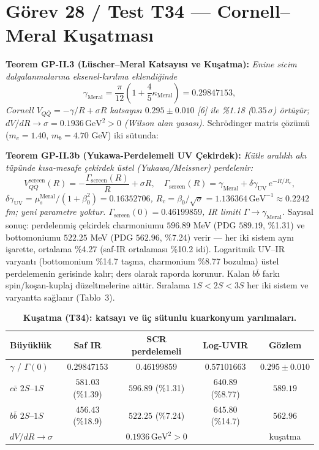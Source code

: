 \documentclass[12pt,a4paper]{article}
\begin{document}
\section{Görev 28 / Test T34 --- Cornell--Meral Kuşatması}

\textbf{Teorem GP-II.3 (Lüscher--Meral Katsayısı ve Kuşatma):} \textit{Enine
sicim dalgalanmalarına eksenel-kırılma eklendiğinde}
\begin{equation}
\boxed{\gamma_{\mathrm{Meral}}=\frac{\pi}{12}
\left(1+\frac{4}{5}\kappa_{\mathrm{Meral}}\right)=0.29847153,}
\end{equation}
\textit{Cornell $V_{Q\bar{Q}}=-\gamma/R+\sigma R$ katsayısı
$0.295\pm 0.010$ [6] ile \%1.18 ($0.35\,\sigma$) örtüşür;
$dV/dR\to\sigma=0.1936\,\mathrm{GeV}^2>0$ (Wilson alan yasası).}
Schrödinger matris çözümü ($m_c=1.40$, $m_b=4.70$ GeV) iki sütunda:

\textbf{Teorem GP-II.3b (Yukawa-Perdelemeli UV Çekirdek):}
\textit{Kütle aralıklı akı tüpünde kısa-mesafe çekirdek üstel (Yukawa/Meissner)
perdelenir:}
\begin{equation}
\boxed{V_{Q\bar{Q}}^{\mathrm{screen}}(R)=-\frac{\Gamma_{\mathrm{screen}}(R)}{R}
+\sigma R,\quad
\Gamma_{\mathrm{screen}}(R)=\gamma_{\mathrm{Meral}}
+\delta\gamma_{\mathrm{UV}}\,e^{-R/R_c},}
\end{equation}
\textit{$\delta\gamma_{\mathrm{UV}}=\mu_s^{\mathrm{Meral}}/(1+\beta_0^2)
=0.16352706$, $R_c=\beta_0/\sqrt{\sigma}=1.136364\,\mathrm{GeV}^{-1}
\approx 0.2242$ fm; yeni parametre yoktur.
$\Gamma_{\mathrm{screen}}(0)=0.46199859$, IR limiti
$\Gamma\to\gamma_{\mathrm{Meral}}$.}
Sayısal sonuç: perdelenmiş çekirdek charmoniumu $596.89$ MeV
(PDG $589.19$, \%1.31) ve bottomoniumu $522.25$ MeV (PDG $562.96$, \%7.24)
verir --- her iki sistem aynı işarette, ortalama \%4.27 (saf-IR ortalaması
\%10.2 idi). Logaritmik UV--IR varyantı (bottomonium \%14.7 taşma, charmonium
\%8.77 bozulma) üstel perdelemenin gerisinde kalır; ders olarak raporda
korunur. Kalan $b\bar{b}$ farkı spin/koşan-kuplaj düzeltmelerine aittir.
Sıralama $1S<2S<3S$ her iki sistem ve varyantta sağlanır (Tablo~3).

\begin{table}[!htbp]
\centering\footnotesize
\setlength{\tabcolsep}{3pt}
\caption{\textbf{Kuşatma (T34): katsayı ve üç sütunlu kuarkonyum yarılmaları.}}
\label{tab:conf}
\vspace{0.1cm}
\begin{tabular}{@{}l|c|c|c|c@{}}
\toprule
Büyüklük & Saf IR & SCR perdelemeli & Log-UVIR & Gözlem \\
\midrule
$\gamma$ / $\Gamma(0)$ & $0.29847153$ & $0.46199859$ & $0.57101663$ & $0.295\pm 0.010$ \\
$c\bar{c}$ $2S$--$1S$ & $581.03$ (\%1.39) & $596.89$ (\%1.31) & $640.89$ (\%8.77) & $589.19$ \\
$b\bar{b}$ $2S$--$1S$ & $456.43$ (\%18.9) & $522.25$ (\%7.24) & $645.80$ (\%14.7) & $562.96$ \\
$dV/dR\to\sigma$ & \multicolumn{3}{c|}{$0.1936\,\mathrm{GeV}^2>0$} & kuşatma \\
\bottomrule
\end{tabular}
\end{table}
\end{document}
